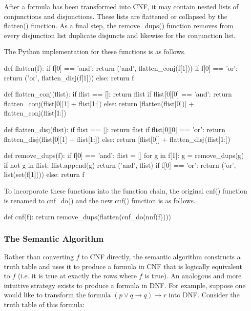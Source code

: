 \documentclass[a4paper,notitlepage]{scrartcl}
\begin{document}
After a formula has been transformed into CNF, it may contain nested lists of
conjunctions and disjunctions.
These lists are flattened or collapsed by the flatten() function.
As a final step, the remove\_dups() function removes from every disjunction
list duplicate disjuncts and likewise for the conjunction list.

The Python implementation for these functions is as follows.

\begin{code}
def flatten(f):
    if f[0] == 'and':
        return ('and', flatten_conj(f[1]))
    if f[0] == 'or':
        return ('or', flatten_disj(f[1]))
    else:
        return f

def flatten_conj(flist):
    if flist == []:
        return flist
    if flist[0][0] == 'and':
        return flatten_conj(flist[0][1] + flist[1:])
    else:
        return [flatten(flist[0])] + flatten_conj(flist[1:])

def flatten_disj(flist):
    if flist == []:
        return flist
    if flist[0][0] == 'or':
        return flatten_disj(flist[0][1] + flist[1:])
    else:
        return [flist[0]] + flatten_disj(flist[1:])

def remove_dups(f):
    if f[0] == 'and':
        flist = []
        for g in f[1]:
            g = remove_dups(g)
            if not g in flist:
                flist.append(g)
        return ('and', flist)
    if f[0] == 'or':
        return ('or', list(set(f[1])))
    else:
        return f
\end{code}

\noindent
To incorporate these functions into the function chain, the original cnf()
function is renamed to cnf\_do() and the new cnf() function is as follows.

\begin{code}
def cnf(f):
    return remove_dups(flatten(cnf_do(nnf(f))))
\end{code}

\subsubsection{The Semantic Algorithm}

Rather than converting $f$ to CNF directly, the semantic algorithm
        constructs a truth table and uses it to produce a formula in CNF
        that is logically equivalent to $f$ (i.e. it is true at exactly
        the rows where $f$ is true). 
An analogous and more intuitive strategy exists to produce a formula in DNF.
For example, suppose one would like to transform the formula
$(p \lor q \to q) \to r$ into DNF.
Consider the truth table of this formula:
\end{document}
